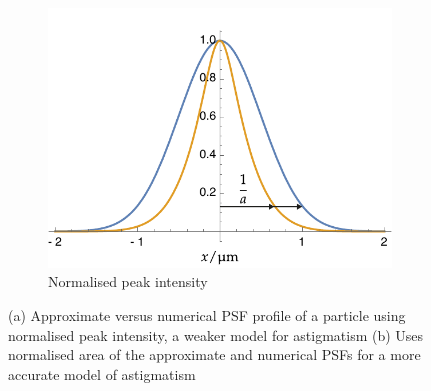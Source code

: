 \begin{figure}
    \centering
    \begin{subfigure}[t]{\linewidth}
        \centering
        \includegraphics{./mathematica/guassian_peak}
        \caption{Normalised peak intensity}\label{fig:guassian_peak}
    \end{subfigure}
  \caption{
  (a) Approximate versus numerical \gls{PSF} profile of a particle using normalised peak intensity, a weaker model for astigmatism
  (b) Uses normalised area of the approximate and numerical PSFs for a more accurate model of astigmatism
  }\label{}
\end{figure}

